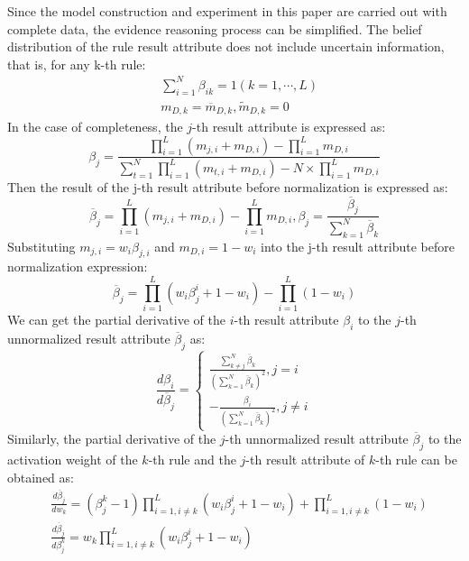 \documentclass{ieeeaccess}
\begin{document}
Since the model construction and experiment in this paper are carried out with complete data, the evidence reasoning process can be simplified.
The belief distribution of the rule result attribute does not include uncertain information, that is, for any k-th rule:
\begin{align}
     & \sum_{i=1}^N\beta_{ik}=1(k=1,\cdots,L)           \\
     & m_{D,k}=\overline{m}_{D,k},\widetilde{m}_{D,k}=0
\end{align}
In the case of completeness, the $j$-th result attribute is expressed as:
\begin{equation}
    \beta_j=\frac{\prod_{i=1}^L(m_{j,i}+m_{D,i})-\prod_{i=1}^Lm_{D,i}}{\sum_{t=1}^N\prod_{i=1}^L(m_{t,i}+m_{D,i})-N\times\prod_{i=1}^Lm_{D,i}}
\end{equation}
Then the result of the j-th result attribute before normalization is expressed as:
\begin{equation}
    \overline{\beta}_j = \prod_{i=1}^L(m_{j,i}+m_{D,i})-\prod_{i=1}^Lm_{D,i},\beta_j=\frac{\overline{\beta}_j}{\sum_{k=1}^N\overline{\beta}_k}
\end{equation}
Substituting $m_{j,i}=w_i\beta_{j,i}$ and $m_{D,i}=1-w_i$ into the j-th result attribute before normalization expression:
\begin{equation}
    \overline{\beta}_j = \prod_{i=1}^L(w_i\beta_j^i+1-w_i)-\prod_{i=1}^L{(1-w_i)}
\end{equation}
We can get the partial derivative of the $i$-th result attribute $\beta_i$ to the $j$-th unnormalized result attribute $\overline{\beta}_j$ as:
\begin{equation}
    \frac{d\beta_i}{d\overline{\beta}_j}=
    \left\{
    \begin{aligned}
        \frac{\sum_{k\neq j}^N\overline{\beta}_k}{(\sum_{k=1}^N\overline{\beta}_k)^2},j=i \\
        -\frac{\beta_i}{(\sum_{k=1}^N\overline{\beta}_k)^2},j\neq i
    \end{aligned}
    \right.
\end{equation}
Similarly, the partial derivative of the $j$-th unnormalized result attribute $\overline{\beta}_j$ to the activation weight of the $k$-th rule and the $j$-th result attribute of $k$-th rule can be obtained as:
\begin{align}
     & \frac{d\overline{\beta}_j}{dw_k}=(\beta_j^k-1)\prod_{i=1,i\neq k}^L(w_i\beta_j^i+1-w_i)+\prod_{i=1,i\neq k}^L(1-w_i) \\
     & \frac{d\overline{\beta}_j}{d\beta_j^k}=w_k\prod_{i=1,i\neq k}^L(w_i\beta_j^i+1-w_i)
\end{align}
\end{document}
